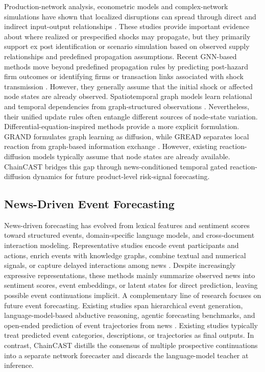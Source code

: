 \documentclass[letterpaper]{article} %
\begin{document}
Production-network analysis, econometric models and complex-network simulations have shown that localized disruptions can spread through direct and indirect input-output relationships \cite{acemoglu2012network,carvalho2021supply,inoue2019firm,li2021ripple}. These studies provide important evidence about where realized or prespecified shocks may propagate, but they primarily support ex post identification or scenario simulation based on observed supply relationships and predefined propagation assumptions. Recent GNN-based methods move beyond predefined propagation rules by predicting post-hazard firm outcomes or identifying firms or transaction links associated with shock transmission \cite{yang2024post,shen2026resilience}. However, they generally assume that the initial shock or affected node states are already observed. Spatiotemporal graph models learn relational and temporal dependencies from graph-structured observations \cite{DBLP:conf/iclr/LiYS018,DBLP:conf/ijcai/YuYZ18,DBLP:conf/nips/0001YL0020,chang2025learning}. Nevertheless, their unified update rules often entangle different sources of node-state variation. Differential-equation-inspired methods provide a more explicit formulation. GRAND formulates graph learning as diffusion, while GREAD separates local reaction from graph-based information exchange \cite{DBLP:conf/icml/0001RGBWR21,DBLP:conf/icml/00020PC23}. However, existing reaction-diffusion models typically assume that node states are already available. ChainCAST bridges this gap through news-conditioned temporal gated reaction-diffusion dynamics for future product-level risk-signal forecasting.

\subsection{News-Driven Event Forecasting}

News-driven forecasting has evolved from lexical features and sentiment scores toward structured events, domain-specific language models, and cross-document interaction modeling. Representative studies encode event participants and actions, enrich events with knowledge graphs, combine textual and numerical signals, or capture delayed interactions among news \cite{DBLP:conf/emnlp/DingZLD14,DBLP:conf/coling/DingZLD16,DBLP:conf/acl/CohenX18,DBLP:journals/corr/abs-1908-10063,DBLP:conf/emnlp/WangCM24}. Despite increasingly expressive representations, these methods mainly summarize observed news into sentiment scores, event embeddings, or latent states for direct prediction, leaving possible event continuations implicit. A complementary line of research focuses on future event forecasting. Existing studies span hierarchical event generation, language-model-based abductive reasoning, agentic forecasting benchmarks, and open-ended prediction of event trajectories from news \cite{DBLP:conf/aaai/HuLNLS17,DBLP:conf/nips/ShiXWZZZTM23,DBLP:journals/corr/abs-2407-01231,yu2025forestcast}. Existing studies typically treat predicted event categories, descriptions, or trajectories as final outputs. In contrast, ChainCAST distills the consensus of multiple prospective continuations into a separate network forecaster and discards the language-model teacher at inference.
\end{document}
